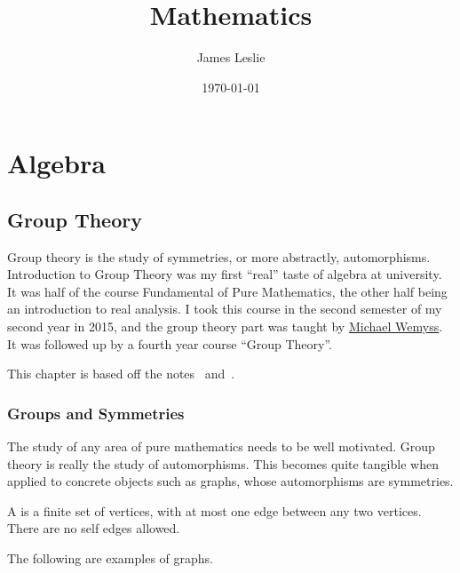 \documentclass[12pt]{report}
\title{Mathematics}
\author{James Leslie}
\date{\today}
\begin{document}
\listoftodos{}
\maketitle
\tableofcontents



\part{Algebra}

\chapter{Group Theory}\label{cha:intr-group-theory}
Group theory is the study of symmetries, or more abstractly, automorphisms.
%
Introduction to Group Theory was my first ``real'' taste of algebra at university.
%
It was half of the course Fundamental of Pure Mathematics, the other half being an introduction to real analysis.
%
I took this course in the second semester of my second year in 2015, and the group theory part was taught by \href{https://www.maths.gla.ac.uk/~mwemyss/}{Michael Wemyss}.
%
It was followed up by a fourth year course ``Group Theory''.


This chapter is based off the notes~\cite{wemyss2015grouptheory} and~\cite{lanini2017grouptheory}.



\section{Groups and Symmetries}
The study of any area of pure mathematics needs to be well motivated.
%
Group theory is really the study of automorphisms.
%
This becomes quite tangible when applied to concrete objects such as graphs, whose automorphisms are symmetries.


\begin{definition}\cite[Definition 1.1.1]{wemyss2015grouptheory}\label{def:intr-group-theory:graph}
  A  is a finite set of vertices, with at most one edge between any two vertices.
  There are no self edges allowed.
\end{definition}

\begin{example}
  The following are examples of graphs.

\end{example}
\end{document}
